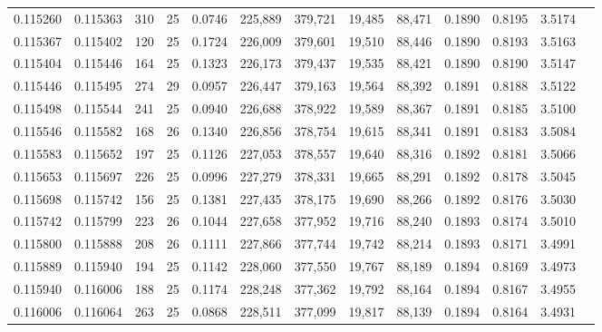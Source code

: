 \begin{tabular}{rrrrrrrrrrrrr}
0.115260 & 0.115363 & 310 &  25 &                                     0.0746 & 225,889 & 379,721 &  19,485 &  88,471 & 0.1890 & 0.8195 & 3.5174 \\
0.115367 & 0.115402 & 120 &  25 &                                     0.1724 & 226,009 & 379,601 &  19,510 &  88,446 & 0.1890 & 0.8193 & 3.5163 \\
0.115404 & 0.115446 & 164 &  25 &                                     0.1323 & 226,173 & 379,437 &  19,535 &  88,421 & 0.1890 & 0.8190 & 3.5147 \\
0.115446 & 0.115495 & 274 &  29 &                                     0.0957 & 226,447 & 379,163 &  19,564 &  88,392 & 0.1891 & 0.8188 & 3.5122 \\
0.115498 & 0.115544 & 241 &  25 &                                     0.0940 & 226,688 & 378,922 &  19,589 &  88,367 & 0.1891 & 0.8185 & 3.5100 \\
0.115546 & 0.115582 & 168 &  26 &                                     0.1340 & 226,856 & 378,754 &  19,615 &  88,341 & 0.1891 & 0.8183 & 3.5084 \\
0.115583 & 0.115652 & 197 &  25 &                                     0.1126 & 227,053 & 378,557 &  19,640 &  88,316 & 0.1892 & 0.8181 & 3.5066 \\
0.115653 & 0.115697 & 226 &  25 &                                     0.0996 & 227,279 & 378,331 &  19,665 &  88,291 & 0.1892 & 0.8178 & 3.5045 \\
0.115698 & 0.115742 & 156 &  25 &                                     0.1381 & 227,435 & 378,175 &  19,690 &  88,266 & 0.1892 & 0.8176 & 3.5030 \\
0.115742 & 0.115799 & 223 &  26 &                                     0.1044 & 227,658 & 377,952 &  19,716 &  88,240 & 0.1893 & 0.8174 & 3.5010 \\
0.115800 & 0.115888 & 208 &  26 &                                     0.1111 & 227,866 & 377,744 &  19,742 &  88,214 & 0.1893 & 0.8171 & 3.4991 \\
0.115889 & 0.115940 & 194 &  25 &                                     0.1142 & 228,060 & 377,550 &  19,767 &  88,189 & 0.1894 & 0.8169 & 3.4973 \\
0.115940 & 0.116006 & 188 &  25 &                                     0.1174 & 228,248 & 377,362 &  19,792 &  88,164 & 0.1894 & 0.8167 & 3.4955 \\
0.116006 & 0.116064 & 263 &  25 &                                     0.0868 & 228,511 & 377,099 &  19,817 &  88,139 & 0.1894 & 0.8164 & 3.4931 \\

\end{tabular}
